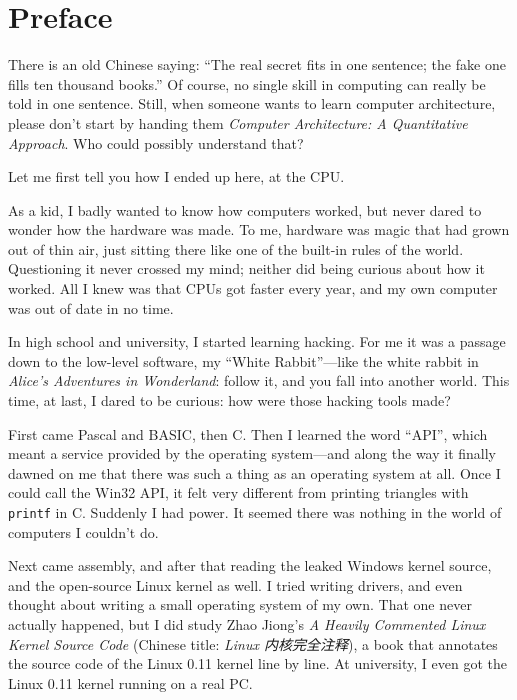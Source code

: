 \chapter{Preface}

There is an old Chinese saying: ``The real secret fits in one sentence; the fake one fills ten thousand books.'' Of course, no single skill in computing can really be told in one sentence. Still, when someone wants to learn computer architecture, please don't start by handing them \emph{Computer Architecture: A Quantitative Approach}. Who could possibly understand that?

Let me first tell you how I ended up here, at the CPU.

As a kid, I badly wanted to know how computers worked, but never dared to wonder how the hardware was made. To me, hardware was magic that had grown out of thin air, just sitting there like one of the built-in rules of the world. Questioning it never crossed my mind; neither did being curious about how it worked. All I knew was that CPUs got faster every year, and my own computer was out of date in no time.

In high school and university, I started learning hacking. For me it was a passage down to the low-level software, my ``White Rabbit''---like the white rabbit in \emph{Alice's Adventures in Wonderland}: follow it, and you fall into another world. This time, at last, I dared to be curious: how were those hacking tools made?

First came Pascal and BASIC, then C. Then I learned the word ``API'', which meant a service provided by the operating system---and along the way it finally dawned on me that there was such a thing as an operating system at all. Once I could call the Win32 API, it felt very different from printing triangles with \texttt{printf} in C. Suddenly I had power. It seemed there was nothing in the world of computers I couldn't do.

Next came assembly, and after that reading the leaked Windows kernel source, and the open-source Linux kernel as well. I tried writing drivers, and even thought about writing a small operating system of my own. That one never actually happened, but I did study Zhao Jiong's \emph{A Heavily Commented Linux Kernel Source Code} (Chinese title: \emph{Linux 内核完全注释}), a book that annotates the source code of the Linux 0.11 kernel line by line. At university, I even got the Linux 0.11 kernel running on a real PC.

